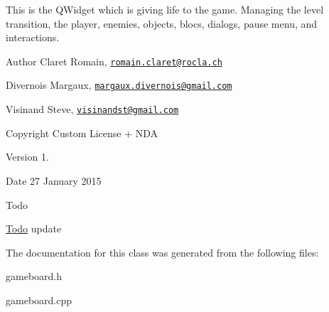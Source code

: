 This is the Q\+Widget which is giving life to the game. Managing the level transition, the player, enemies, objects, blocs, dialogs, pause menu, and interactions. \begin{DoxyAuthor}{Author}
Claret Romain, \href{mailto:romain.claret@rocla.ch}{\tt romain.\+claret@rocla.\+ch} 

Divernois Margaux, \href{mailto:margaux.divernois@gmail.com}{\tt margaux.\+divernois@gmail.\+com} 

Visinand Steve, \href{mailto:visinandst@gmail.com}{\tt visinandst@gmail.\+com} 
\end{DoxyAuthor}
\begin{DoxyCopyright}{Copyright}
Custom License + N\+D\+A 
\end{DoxyCopyright}
\begin{DoxyVersion}{Version}
1. 
\end{DoxyVersion}
\begin{DoxyDate}{Date}
27 January 2015 
\end{DoxyDate}
\begin{DoxyRefDesc}{Todo}
\item[\hyperlink{todo__todo000007}{Todo}]update \end{DoxyRefDesc}


The documentation for this class was generated from the following files\+:\begin{DoxyCompactItemize}
\item 
gameboard.\+h\item 
gameboard.\+cpp\end{DoxyCompactItemize}
